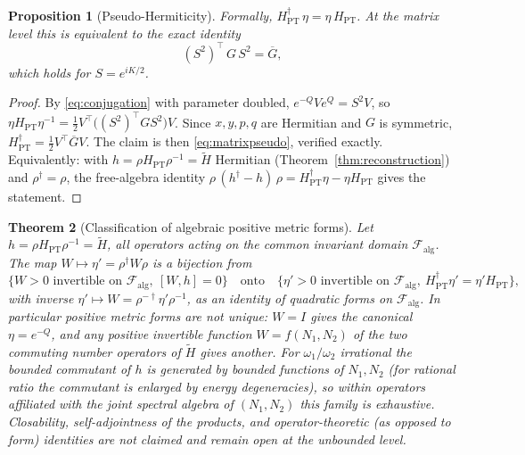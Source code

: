 \documentclass[11pt]{article}
\newtheorem{theorem}{Theorem}[section]
\newtheorem{proposition}[theorem]{Proposition}
\theoremstyle{definition}
\theoremstyle{remark}
\newcommand{\w}{\omega}
\newcommand{\dg}{\dagger}
\begin{document}
\begin{proposition}[Pseudo-Hermiticity]\label{prop:pseudo}
Formally, $H_{\mathrm{PT}}^{\dg}\,\eta=\eta\,H_{\mathrm{PT}}$.  At the matrix
level this is equivalent to the exact identity
\begin{equation}\label{eq:matrixpseudo}
(S^2)^{\top}\,G\,S^2=\overline G ,
\end{equation}
which holds for $S=e^{iK/2}$.
\end{proposition}

\begin{proof}
By \eqref{eq:conjugation} with parameter doubled,
$e^{-Q}Ve^{Q}=S^2V$, so
$\eta H_{\mathrm{PT}}\eta^{-1}=\tfrac12V^{\top}\!\big((S^2)^{\top}GS^2\big)V$.
Since $x,y,p,q$ are Hermitian and $G$ is symmetric,
$H_{\mathrm{PT}}^{\dg}=\tfrac12V^{\top}\overline GV$.  The claim is then
\eqref{eq:matrixpseudo}, verified exactly.  Equivalently: with
$h=\rho H_{\mathrm{PT}}\rho^{-1}=\widetilde H$ Hermitian
(Theorem~\ref{thm:reconstruction}) and $\rho^{\dg}=\rho$, the free-algebra
identity $\rho\,(h^{\dg}-h)\,\rho
=H_{\mathrm{PT}}^{\dg}\eta-\eta H_{\mathrm{PT}}$ gives the statement.
\end{proof}

\begin{theorem}[Classification of algebraic positive metric forms]
\label{thm:metrics}
Let $h=\rho H_{\mathrm{PT}}\rho^{-1}=\widetilde H$, all operators acting
on the common invariant domain $\mathcal F_{\mathrm{alg}}$.  The map
$W\mapsto\eta'=\rho^{\dg}W\rho$ is a bijection from
\begin{equation}
\{W>0 \text{ invertible on }\mathcal F_{\mathrm{alg}},\ [W,h]=0\}
\quad\text{onto}\quad
\{\eta'>0 \text{ invertible on }\mathcal F_{\mathrm{alg}},\
H_{\mathrm{PT}}^{\dg}\eta'=\eta'H_{\mathrm{PT}}\},
\end{equation}
with inverse $\eta'\mapsto W=\rho^{-\dg}\eta'\rho^{-1}$, as an identity of
quadratic forms on $\mathcal F_{\mathrm{alg}}$.  In particular positive
metric forms are \emph{not} unique: $W=I$ gives the
canonical $\eta=e^{-Q}$, and any positive invertible function
$W=f(N_1,N_2)$ of the two commuting number operators of $\widetilde H$ gives
another.  For $\w_1/\w_2$ irrational the bounded commutant of $h$ is
generated by bounded functions of $N_1,N_2$ (for rational ratio the
commutant is enlarged by energy degeneracies), so within operators
affiliated with the joint spectral algebra of $(N_1,N_2)$ this family is
exhaustive.  Closability, self-adjointness of the products, and
operator-theoretic (as opposed to form) identities are not claimed and
remain open at the unbounded level.
\end{theorem}
\end{document}
